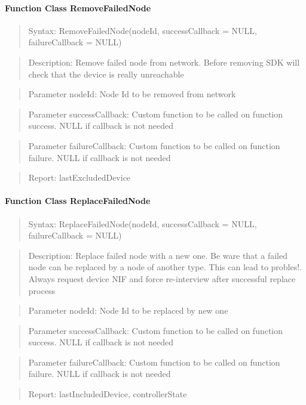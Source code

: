 \paragraph{Function Class RemoveFailedNode}
\begin{quote}Syntax: RemoveFailedNode(nodeId, successCallback = NULL, failureCallback = NULL)\end{quote}
\begin{quote}Description: Remove failed node from network. Before removing SDK will check that the device is really unreachable\end{quote}
\begin{quote}Parameter nodeId: Node Id to be removed from network\end{quote}
\begin{quote}Parameter successCallback: Custom function to be called on function success. NULL if callback is not needed\end{quote}
\begin{quote}Parameter failureCallback: Custom function to be called on function failure. NULL if callback is not needed\end{quote}
\begin{quote}Report: lastExcludedDevice\end{quote}

\paragraph{Function Class ReplaceFailedNode}
\begin{quote}Syntax: ReplaceFailedNode(nodeId, successCallback = NULL, failureCallback = NULL)\end{quote}
\begin{quote}Description: Replace failed node with a new one. Be ware that a failed node can be replaced by a node of another type. This can lead to probles!. Always request device NIF and force re-interview after successful replace process\end{quote}
\begin{quote}Parameter nodeId: Node Id to be replaced by new one\end{quote}
\begin{quote}Parameter successCallback: Custom function to be called on function success. NULL if callback is not needed\end{quote}
\begin{quote}Parameter failureCallback: Custom function to be called on function failure. NULL if callback is not needed\end{quote}
\begin{quote}Report: lastIncludedDevice, controllerState\end{quote}


